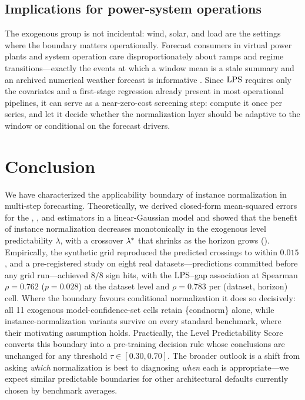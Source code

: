 \subsection{Implications for power-system operations}

The exogenous group is not incidental: wind, solar, and load are the settings where the boundary matters operationally. Forecast consumers in virtual power plants and system operation care disproportionately about ramps and regime transitions---exactly the events at which a window mean is a stale summary and an archived numerical weather forecast is informative \citep{hong2016gefcom,patil2022wind}. Since $\mathrm{LPS}$ requires only the covariates and a first-stage regression already present in most operational pipelines, it can serve as a near-zero-cost screening step: compute it once per series, and let it decide whether the normalization layer should be adaptive to the window or conditional on the forecast drivers.

\section{Conclusion}\label{sec:conclusion}

We have characterized the applicability boundary of instance normalization in multi-step forecasting. Theoretically, we derived closed-form mean-squared errors for the \rawm, \inm, and \cnm{} estimators in a linear-Gaussian model and showed that the benefit of instance normalization decreases monotonically in the exogenous level predictability $\lambda$, with a crossover $\lambda^{*}$ that shrinks as the horizon grows (). Empirically, the synthetic grid reproduced the predicted crossings to within $0.015$, and a pre-registered study on eight real datasets---predictions committed before any grid run---achieved $8/8$ sign hits, with the $\mathrm{LPS}$--gap association at Spearman $\rho = 0.762$ ($p = 0.028$) at the dataset level and $\rho = 0.783$ per (dataset, horizon) cell. Where the boundary favours conditional normalization it does so decisively: all 11 exogenous model-confidence-set cells retain \{condnorm\} alone, while instance-normalization variants survive on every standard benchmark, where their motivating assumption holds. Practically, the Level Predictability Score converts this boundary into a pre-training decision rule whose conclusions are unchanged for any threshold $\tau \in [0.30, 0.70]$. The broader outlook is a shift from asking \emph{which} normalization is best to diagnosing \emph{when} each is appropriate---we expect similar predictable boundaries for other architectural defaults currently chosen by benchmark averages.
